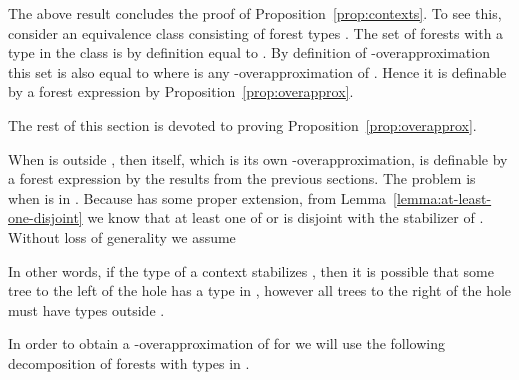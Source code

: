 \documentclass{LMCS}
\begin{document}
\newcommand{\overap}[1]{\hat{#1}} The above result concludes
the proof of Proposition~\ref{prop:contexts}. To see this, consider an equivalence
class consisting of forest types . The set of
forests with a type in the class is by definition equal to
. By definition of -overapproximation this
set is also equal to  where  is any -overapproximation of . Hence it is definable by a
 forest expression by Proposition~\ref{prop:overapprox}.

The rest of this section is devoted to proving
Proposition~\ref{prop:overapprox}. 

When  is outside , then  itself, which is its own
-overapproximation, is definable by a  forest expression
by the results from the previous sections. The problem is when  is
in .  Because  has some proper extension, from
Lemma~\ref{lemma:at-least-one-disjoint} we know that at least one of   or  is disjoint with the stabilizer of . Without loss of generality we assume

In other words, if the type of a context stabilizes , then it is
possible that some tree to the left of the hole has a type in ,
however all trees to the right of the hole must have types outside .

In order to obtain a -overapproximation of  for  we
will use the following decomposition of forests with types in .
\end{document}
